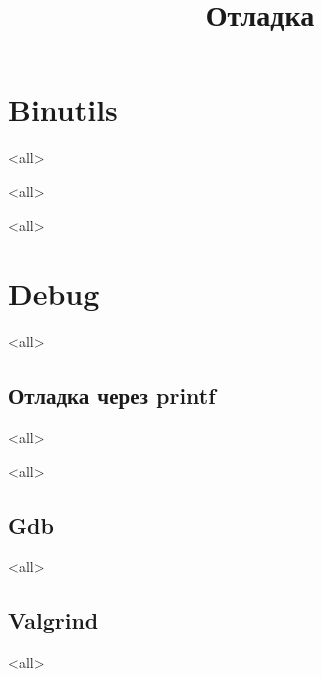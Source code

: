 
\title{Отладка}



\begin{frame}
  \frametitle{}
  \titlepage
\end{frame}
\section{Binutils}

\mode<all>{}

\mode<all>{}

\mode<all>{}

\section{Debug}

\mode<all>{}

\subsection{Отладка через printf}
\mode<all>{}

\mode<all>{}

\subsection{Gdb}

\mode<all>{}

\subsection{Valgrind}
\mode<all>{}



